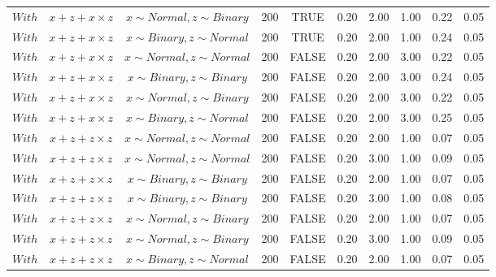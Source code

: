 \begin{longtable}{lccccccccc}
  $With$ & $\textit{x} + \textit{z} + \textit{x} \times \textit{z}$ & $\textit{x} \sim Normal, \textit{z} \sim Binary$ & 200 & TRUE & 0.20 & 2.00 & 1.00 & 0.22 & 0.05 \\ 
  $With$ & $\textit{x} + \textit{z} + \textit{x} \times \textit{z}$ & $\textit{x} \sim Binary, \textit{z} \sim Normal$ & 200 & TRUE & 0.20 & 2.00 & 1.00 & 0.24 & 0.05 \\ 
  $With$ & $\textit{x} + \textit{z} + \textit{x} \times \textit{z}$ & $\textit{x} \sim Normal , \textit{z} \sim Normal$ & 200 & FALSE & 0.20 & 2.00 & 3.00 & 0.22 & 0.05 \\ 
  $With$ & $\textit{x} + \textit{z} + \textit{x} \times \textit{z}$ & $\textit{x} \sim Binary, \textit{z} \sim Binary$ & 200 & FALSE & 0.20 & 2.00 & 3.00 & 0.24 & 0.05 \\ 
  $With$ & $\textit{x} + \textit{z} + \textit{x} \times \textit{z}$ & $\textit{x} \sim Normal, \textit{z} \sim Binary$ & 200 & FALSE & 0.20 & 2.00 & 3.00 & 0.22 & 0.05 \\ 
  $With$ & $\textit{x} + \textit{z} + \textit{x} \times \textit{z}$ & $\textit{x} \sim Binary, \textit{z} \sim Normal$ & 200 & FALSE & 0.20 & 2.00 & 3.00 & 0.25 & 0.05 \\ 
  $With$ & $\textit{x} + \textit{z} + \textit{z} \times \textit{z}$ & $\textit{x} \sim Normal , \textit{z} \sim Normal$ & 200 & FALSE & 0.20 & 2.00 & 1.00 & 0.07 & 0.05 \\ 
  $With$ & $\textit{x} + \textit{z} + \textit{z} \times \textit{z}$ & $\textit{x} \sim Normal , \textit{z} \sim Normal$ & 200 & FALSE & 0.20 & 3.00 & 1.00 & 0.09 & 0.05 \\ 
  $With$ & $\textit{x} + \textit{z} + \textit{z} \times \textit{z}$ & $\textit{x} \sim Binary, \textit{z} \sim Binary$ & 200 & FALSE & 0.20 & 2.00 & 1.00 & 0.07 & 0.05 \\ 
  $With$ & $\textit{x} + \textit{z} + \textit{z} \times \textit{z}$ & $\textit{x} \sim Binary, \textit{z} \sim Binary$ & 200 & FALSE & 0.20 & 3.00 & 1.00 & 0.08 & 0.05 \\ 
  $With$ & $\textit{x} + \textit{z} + \textit{z} \times \textit{z}$ & $\textit{x} \sim Normal, \textit{z} \sim Binary$ & 200 & FALSE & 0.20 & 2.00 & 1.00 & 0.07 & 0.05 \\ 
  $With$ & $\textit{x} + \textit{z} + \textit{z} \times \textit{z}$ & $\textit{x} \sim Normal, \textit{z} \sim Binary$ & 200 & FALSE & 0.20 & 3.00 & 1.00 & 0.09 & 0.05 \\ 
  $With$ & $\textit{x} + \textit{z} + \textit{z} \times \textit{z}$ & $\textit{x} \sim Binary, \textit{z} \sim Normal$ & 200 & FALSE & 0.20 & 2.00 & 1.00 & 0.07 & 0.05 \\ 

\end{longtable}
